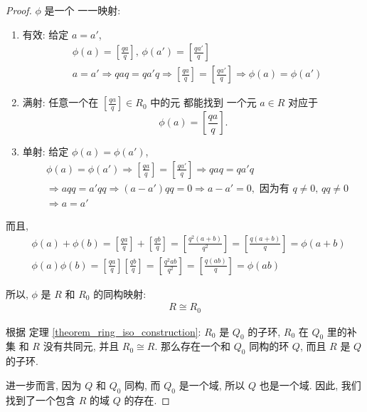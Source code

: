 \documentclass[utf8]{ctexbook}
\theoremstyle{definition}
\begin{document}
\begin{proof}
$\phi$ 是一个 一一映射:
\begin{enumerate}
\item{有效: 给定 $a = a'$,
\begin{align*}
& \phi(a) = \left[ \frac{q a}{q} \right], \, \phi(a') = \left[ \frac{q a'}{q} \right] \\
& a = a' \Longrightarrow q a q = q a' q \Longrightarrow \left[ \frac{q a}{q} \right] = \left[ \frac{q a'}{q} \right] \Longrightarrow \phi(a) = \phi(a')
\end{align*}
}
\item{满射: 任意一个在 $\left[ \frac{q a}{q} \right] \in R_0$ 中的元 都能找到 一个元 $a \in R$ 对应于 
$$\phi(a) = \left[ \frac{q a}{q} \right] .$$}
\item{单射: 给定 $\phi(a) = \phi(a') $, 
\begin{align*}
& \phi(a) = \phi(a') \Longrightarrow \left[ \frac{q a}{q} \right] = \left[ \frac{q a'}{q} \right] \Longrightarrow q a q = q a' q \\
& \Longrightarrow a q q = a' q q \Longrightarrow (a - a') q q = 0 \Longrightarrow a - a' = 0, \mbox{ 因为有 } q \neq 0, \, q q \neq 0 \\
& \Longrightarrow a = a' 
\end{align*}
}
\end{enumerate}

而且,
\begin{align*}
& \phi(a) + \phi(b) = \left[ \frac{q a}{q} \right] + \left[ \frac{q b}{q} \right] = \left[ \frac{q^2 (a + b)  }{q^2 } \right] = \left[ \frac{q (a + b)  }{q } \right] = \phi(a+b) \\
& \phi(a)  \phi(b) =  \left[ \frac{q a}{q} \right]  \left[ \frac{q b}{q} \right] = \left[ \frac{q^2 a b}{q^2} \right] = \left[ \frac{q (a b) }{q} \right] = \phi(ab)
\end{align*}

所以, $\phi$ 是 $R$ 和 $R_0$ 的同构映射:
\begin{align*}
R \cong R_0
\end{align*}

根据 定理 \ref{theorem_ring_iso_construction}: $R_0$ 是 $Q_0$ 的子环, $R_0$ 在 $Q_0$ 里的补集 和 $R$ 没有共同元, 并且 $R_0 \cong R$. 那么存在一个和 $Q_0$ 同构的环 $Q$, 而且 $R$ 是 $Q$ 的子环. 

进一步而言, 因为 $Q$ 和 $Q_0$ 同构, 而 $Q_0$ 是一个域, 所以 $Q$ 也是一个域. 因此, 我们找到了一个包含 $R$ 的域 $Q$ 的存在.

\end{proof}
\end{document}
